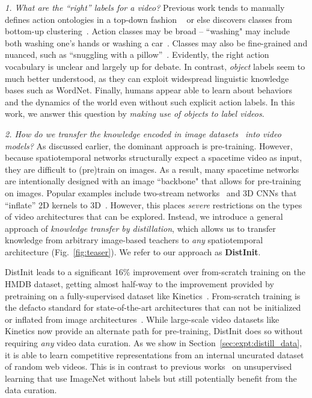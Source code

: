 \documentclass[10pt,twocolumn,letterpaper]{article}
\newcommand{\METHOD}[0]{DistInit}
\begin{document}
{\noindent \em 1. What are the ``right'' labels for a video?} Previous work tends to manually defines action ontologies in a top-down fashion
~\cite{ucf101,hmdb51,kay2017kinetics} 
or else discovers classes from bottom-up clustering~\cite{yang2013discovering,fouhey2018vlog}. 
Action classes may be broad -- ``washing" may include both washing one's hands or washing a car~\cite{over2014trecvid}. Classes may also be fine-grained and nuanced, such as ``snuggling with a pillow''~\cite{charades}.
Evidently, the right action vocabulary is unclear and largely up for debate. In contrast, {\em object} labels seem to much better understood, as they can exploit widespread linguistic knowledge bases such as WordNet.
Finally, humans appear able to learn about behaviors and the dynamics of the world even without such explicit action labels.
In this work, we answer this question by {\em making use of objects to label videos}. 

{\noindent \em 2. How do we transfer the knowledge encoded in image datasets~\cite{ImageNet,zhou2017places,lin2014microsoft} into video models?} 
  As discussed earlier, the dominant approach is pre-training. However, because spatiotemporal networks structurally expect a spacetime video as input, they are difficult to (pre)train on images. As a result, many spacetime networks are intentionally designed with an image ``backbone" that allows for pre-training on images. Popular examples include two-stream networks~\cite{Simonyan_14a} and 3D CNNs that ``inflate'' 2D kernels to 3D~\cite{carreira2017quo,Feichtenhofer_17,Feichtenhofer_16b}. However, this places {\em severe} restrictions on the types of video architectures that can be explored. Instead, we introduce a general approach of {\em knowledge transfer by distillation}, which allows us to transfer knowledge from arbitrary image-based teachers to {\em any} spatiotemporal architecture (Fig.~\ref{fig:teaser}). We refer to our approach as {\bf \METHOD{}}. 


\METHOD{} leads to a significant 16\% improvement over from-scratch training on the HMDB dataset, getting almost half-way to the improvement provided by pretraining on a fully-supervised dataset like Kinetics~\cite{kay2017kinetics}. From-scratch training is the defacto standard for state-of-the-art architectures that can not be initialized or inflated from image architectures~\cite{tran2018closer}. While large-scale video datasets like Kinetics now provide an alternate path for pre-training, \METHOD{} does so without requiring {\em any} video data curation. As we show in Section~\ref{sec:expt:distill_data}, it is able to learn competitive representations from an internal uncurated dataset of random web videos. This is in contrast to previous works~\cite{noroozi2018boosting,doersch2015unsupervised,gidaris2018unsupervised} on unsupervised learning that use ImageNet without labels but still potentially benefit from the data curation.
\end{document}
